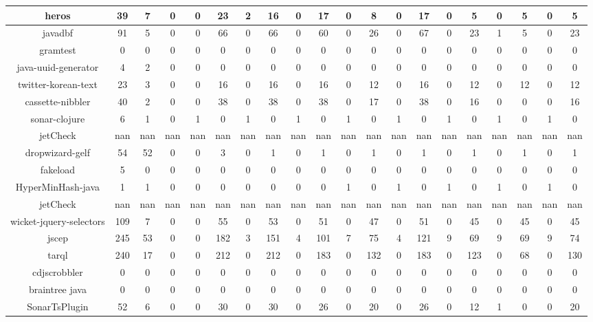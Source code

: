 \begin{table}
\begin{tabular}{|c|c|c|c|c|c|c|c|c|c|c|c|c|c|c|c|c|c|c|c|}
\hline
heros & 39 & 7 & 0 & 0 & 23 & 2 & 16 & 0 & 17 & 0 & 8 & 0 & 17 & 0 & 5 & 0 & 5 & 0 & 5 \\
\hline
javadbf & 91 & 5 & 0 & 0 & 66 & 0 & 66 & 0 & 60 & 0 & 26 & 0 & 67 & 0 & 23 & 1 & 5 & 0 & 23 \\
\hline
gramtest & 0 & 0 & 0 & 0 & 0 & 0 & 0 & 0 & 0 & 0 & 0 & 0 & 0 & 0 & 0 & 0 & 0 & 0 & 0 \\
\hline
java-uuid-generator & 4 & 2 & 0 & 0 & 0 & 0 & 0 & 0 & 0 & 0 & 0 & 0 & 0 & 0 & 0 & 0 & 0 & 0 & 0 \\
\hline
twitter-korean-text & 23 & 3 & 0 & 0 & 16 & 0 & 16 & 0 & 16 & 0 & 12 & 0 & 16 & 0 & 12 & 0 & 12 & 0 & 12 \\
\hline
cassette-nibbler & 40 & 2 & 0 & 0 & 38 & 0 & 38 & 0 & 38 & 0 & 17 & 0 & 38 & 0 & 16 & 0 & 0 & 0 & 16 \\
\hline
sonar-clojure & 6 & 1 & 0 & 1 & 0 & 1 & 0 & 1 & 0 & 1 & 0 & 1 & 0 & 1 & 0 & 1 & 0 & 1 & 0 \\
\hline
jetCheck & nan & nan & nan & nan & nan & nan & nan & nan & nan & nan & nan & nan & nan & nan & nan & nan & nan & nan & nan \\
\hline
dropwizard-gelf & 54 & 52 & 0 & 0 & 3 & 0 & 1 & 0 & 1 & 0 & 1 & 0 & 1 & 0 & 1 & 0 & 1 & 0 & 1 \\
\hline
fakeload & 5 & 0 & 0 & 0 & 0 & 0 & 0 & 0 & 0 & 0 & 0 & 0 & 0 & 0 & 0 & 0 & 0 & 0 & 0 \\
\hline
HyperMinHash-java & 1 & 1 & 0 & 0 & 0 & 0 & 0 & 0 & 0 & 1 & 0 & 1 & 0 & 1 & 0 & 1 & 0 & 1 & 0 \\
\hline
jetCheck & nan & nan & nan & nan & nan & nan & nan & nan & nan & nan & nan & nan & nan & nan & nan & nan & nan & nan & nan \\
\hline
wicket-jquery-selectors & 109 & 7 & 0 & 0 & 55 & 0 & 53 & 0 & 51 & 0 & 47 & 0 & 51 & 0 & 45 & 0 & 45 & 0 & 45 \\
\hline
jscep & 245 & 53 & 0 & 0 & 182 & 3 & 151 & 4 & 101 & 7 & 75 & 4 & 121 & 9 & 69 & 9 & 69 & 9 & 74 \\
\hline
tarql & 240 & 17 & 0 & 0 & 212 & 0 & 212 & 0 & 183 & 0 & 132 & 0 & 183 & 0 & 123 & 0 & 68 & 0 & 130 \\
\hline
cdjscrobbler & 0 & 0 & 0 & 0 & 0 & 0 & 0 & 0 & 0 & 0 & 0 & 0 & 0 & 0 & 0 & 0 & 0 & 0 & 0 \\
\hline
braintree java & 0 & 0 & 0 & 0 & 0 & 0 & 0 & 0 & 0 & 0 & 0 & 0 & 0 & 0 & 0 & 0 & 0 & 0 & 0 \\
\hline
SonarTsPlugin & 52 & 6 & 0 & 0 & 30 & 0 & 30 & 0 & 26 & 0 & 20 & 0 & 26 & 0 & 12 & 1 & 0 & 0 & 20 \\

\end{tabular}
\end{table}
